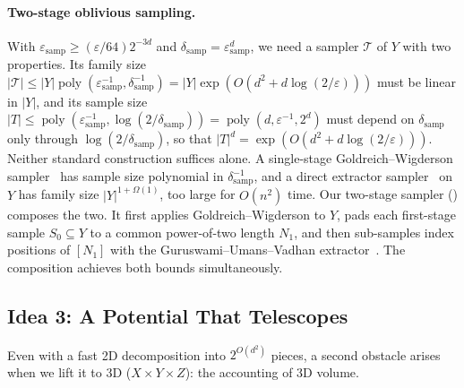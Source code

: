 \documentclass[11pt]{article}
\theoremstyle{definition}
\renewcommand{\label}[1]{}%
\newcommand{\poly}{\operatorname{poly}}
\newcommand{\abs}[1]{\left\lvert #1 \right\rvert}
\begin{document}
\paragraph{Two-stage oblivious sampling.}
With $\varepsilon_{\text{samp}} \ge (\varepsilon/64)2^{-3d}$ and $\delta_{\text{samp}} = \varepsilon_{\text{samp}}^d$, we need a sampler $\mathcal{T}$ of $Y$ with two properties. Its family size $\abs{\mathcal{T}} \le \abs{Y}\poly(\varepsilon_{\text{samp}}^{-1}, \delta_{\text{samp}}^{-1}) = \abs{Y} \exp(O(d^2 + d\log(2/\varepsilon)))$ must be linear in $\abs{Y}$, and its sample size $\abs{T} \le \poly(\varepsilon_{\text{samp}}^{-1}, \log(2/\delta_{\text{samp}})) = \poly(d, \varepsilon^{-1}, 2^d)$ must depend on $\delta_{\text{samp}}$ only through $\log(2/\delta_{\text{samp}})$, so that $\abs{T}^d = \exp(O(d^2 + d\log(2/\varepsilon)))$. Neither standard construction suffices alone. A single-stage Goldreich--Wigderson sampler~\cite{GoldreichW97} has sample size polynomial in $\delta_{\text{samp}}^{-1}$, and a direct extractor sampler~\cite{Zuckerman97,GUV09} on $Y$ has family size $\abs{Y}^{1 + \Omega(1)}$, too large for $O(n^2)$ time. Our two-stage sampler () composes the two. It first applies Goldreich--Wigderson to $Y$, pads each first-stage sample $S_0 \subseteq Y$ to a common power-of-two length $N_1$, and then sub-samples index positions of $[N_1]$ with the Guruswami--Umans--Vadhan extractor~\cite{GUV09}. The composition achieves both bounds simultaneously.

\subsection{Idea 3: A Potential That Telescopes}
\label{sec:overview-potential}

Even with a fast 2D decomposition into $2^{O(d^2)}$ pieces, a second obstacle arises when we lift it to 3D ($X \times Y \times Z$): the accounting of 3D volume.
\end{document}
